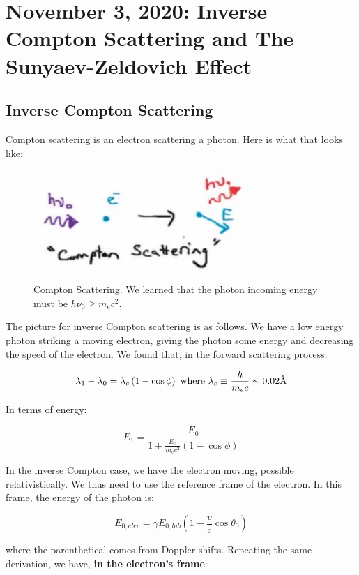 \documentclass{article}
\newcommand{\angstrom}{\mbox{\normalfont\AA}}
\begin{document}
\section{November 3, 2020: Inverse Compton Scattering and The Sunyaev-Zeldovich Effect}

\subsection{Inverse Compton Scattering}

Compton scattering is an electron scattering a photon. Here is what that looks like: 

\begin{figure}
    \centering
    \includegraphics[width=0.75\textwidth]{figures/Screen Shot 2020-11-01 at 4.20.53 PM.png}
    \caption{Compton Scattering. We learned that the photon incoming energy must be $h \nu_0 \geq m_e c^2$.}
    \label{fig:comptonsca}
\end{figure}

The picture for inverse Compton scattering is as follows. We have a low energy photon striking a moving electron, giving the photon some energy and decreasing the speed of the electron. We found that, in the forward scattering process:

$$
\lambda_1 - \lambda_0 = \lambda_c \left(1-\cos\phi\right) \text{ where } \lambda_c \equiv \frac{h}{m_e c} \sim 0.02 \angstrom
$$

In terms of energy:

$$
E_1 = \frac{E_0}{1 + \frac{E_0}{m_e c^2}\left(1 - \cos\phi\right)}
$$

In the inverse Compton case, we have the electron moving, possible relativistically. We thus need to use the reference frame of the electron. In this frame, the energy of the photon is:

$$
E_{0,elec} = \gamma E_{0,lab} \left(1-\frac{v}{c}\cos\theta_0\right)
$$

where the parenthetical comes from Doppler shifts. Repeating the same derivation, we have, \textbf{in the electron's frame}:
\end{document}
